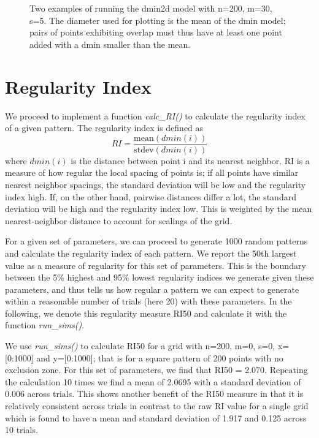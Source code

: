 \documentclass{article}
\begin{document}
\begin{figure}[h]
\begin{subfigure}[t]{0.33\linewidth}
		\subcaption{}
		\label{fig:dmin2}	
	\end{subfigure}
\label{fig:dmin}
\caption{Two examples of running the dmin2d model with n=200, m=30, s=5. The diameter used for plotting is the mean of the dmin model; pairs of points exhibiting overlap must thus have at least one point added with a dmin smaller than the mean.}
\end{figure}

\section{Regularity Index}

We proceed to implement a function \textit{calc\_RI()} to calculate the regularity index of a given pattern. The regularity index is defined as
\begin{equation}
	RI = \dfrac{\text{mean}(dmin(i))}{\text{stdev}(dmin(i))}
\end{equation} 
where $dmin(i)$ is the distance between point i and its nearest neighbor.
RI is a measure of how regular the local spacing of points is; if all points have similar nearest neighbor spacings, the standard deviation will be low and the regularity index high. If, on the other hand, pairwise distances differ a lot, the standard deviation will be high and the regularity index low. This is weighted by the mean nearest-neighbor distance to account for scalings of the grid.

For a given set of parameters, we can proceed to generate 1000 random patterns and calculate the regularity index of each pattern. We report the 50th largest value as a measure of regularity for this set of parameters.
This is the boundary between the 5\% highest and 95\% lowest regularity indices we generate given these parameters, and thus tells us how regular a pattern we can expect to generate within a reasonable number of trials (here 20) with these parameters.
In the following, we denote this regularity measure RI50 and calculate it with the function \textit{run\_sims()}.

We use \textit{run\_sims()} to calculate RI50 for a grid with n=200, m=0, s=0, x=[0:1000] and y=[0:1000]; that is for a square pattern of 200 points with no exclusion zone.
For this set of parameters, we find that RI50 = 2.070. Repeating the calculation 10 times we find a mean of 2.0695 with a standard deviation of 0.006 across trials.
This shows another benefit of the RI50 measure in that it is relatively consistent across trials in contrast to the raw RI value for a single grid which is found to have a mean and standard deviation of 1.917 and 0.125 across 10 trials.
\end{document}
